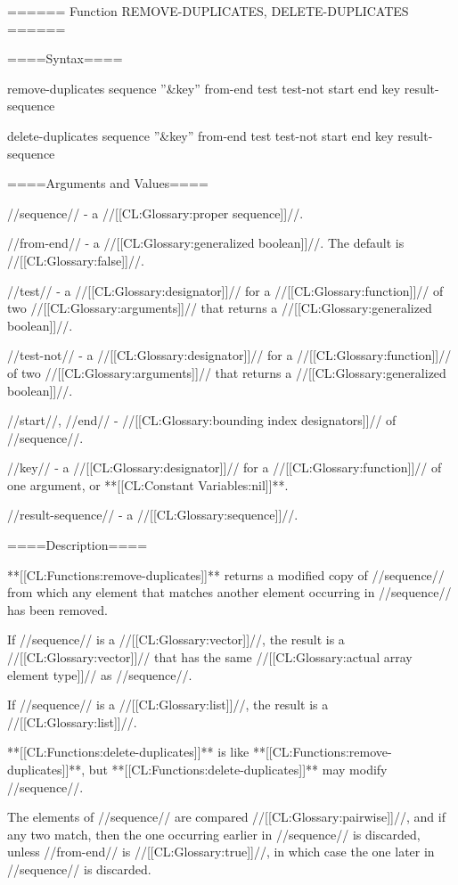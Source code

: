 ====== Function REMOVE-DUPLICATES, DELETE-DUPLICATES ======

====Syntax====

\DefunWithValuesNewline remove-duplicates {sequence ''&key'' from-end test test-not start end key} {result-sequence}

\DefunWithValuesNewline delete-duplicates {sequence ''&key'' from-end test test-not start end key} {result-sequence}

====Arguments and Values====

//sequence// - a //[[CL:Glossary:proper sequence]]//.

//from-end// - a //[[CL:Glossary:generalized boolean]]//. The default is //[[CL:Glossary:false]]//.

//test// - a //[[CL:Glossary:designator]]// for a //[[CL:Glossary:function]]// of two //[[CL:Glossary:arguments]]// that returns a //[[CL:Glossary:generalized boolean]]//.

//test-not// - a //[[CL:Glossary:designator]]// for a //[[CL:Glossary:function]]// of two //[[CL:Glossary:arguments]]// that returns a //[[CL:Glossary:generalized boolean]]//.

//start//, //end// - //[[CL:Glossary:bounding index designators]]// of //sequence//. 

//key// - a //[[CL:Glossary:designator]]// for a //[[CL:Glossary:function]]// of one argument, or **[[CL:Constant Variables:nil]]**.

//result-sequence// - a //[[CL:Glossary:sequence]]//.

====Description====

**[[CL:Functions:remove-duplicates]]** returns a modified copy of //sequence// from which any element that matches another element occurring in //sequence// has been removed.

If //sequence// is a //[[CL:Glossary:vector]]//, the result is a //[[CL:Glossary:vector]]// that has the same //[[CL:Glossary:actual array element type]]// as //sequence//.

If //sequence// is a //[[CL:Glossary:list]]//, the result is a //[[CL:Glossary:list]]//.

**[[CL:Functions:delete-duplicates]]** is like **[[CL:Functions:remove-duplicates]]**, but **[[CL:Functions:delete-duplicates]]** may modify //sequence//.

The elements of //sequence// are compared //[[CL:Glossary:pairwise]]//, and if any two match, then the one occurring earlier in //sequence// is discarded, unless //from-end// is //[[CL:Glossary:true]]//, in which case the one later in //sequence// is discarded.

